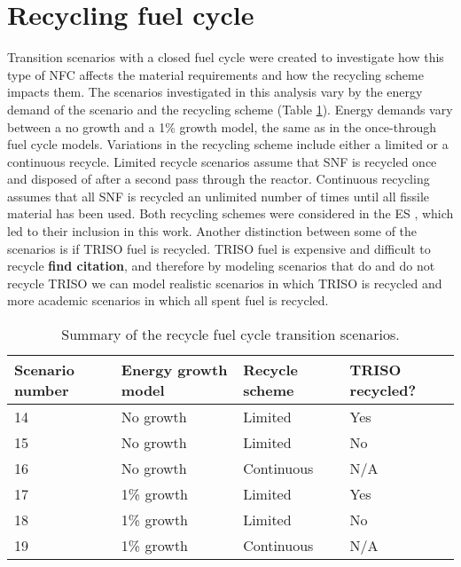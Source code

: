 \section{Recycling fuel cycle}\label{sec:recycle-methods}
Transition scenarios with a closed fuel cycle were created
to investigate how this type of \gls{NFC} affects the material requirements 
and how the recycling scheme impacts them. The scenarios investigated in 
this analysis vary by the energy demand of the scenario and the recycling 
scheme (Table \ref{tab:scenarios_recycle}). Energy demands vary 
between a no growth and a 1\% growth model, the same as in the once-through 
fuel cycle models. Variations in the recycling 
scheme include either a limited or a continuous recycle. Limited recycle 
scenarios assume that \gls{SNF} is recycled once and disposed of after a 
second pass through the reactor. Continuous recycling assumes that all 
\gls{SNF} is recycled an unlimited number of times until all fissile 
material has been used. Both recycling schemes were considered in the 
\acrfull{ES} \cite{wigeland_nuclear_2014}, which led to their inclusion 
in this work. Another distinction between some of the 
scenarios is if \gls{TRISO} fuel is recycled. \gls{TRISO} fuel is 
expensive and difficult to recycle \textbf{find citation}, and 
therefore by modeling scenarios that do and do not recycle 
\gls{TRISO} we can model realistic scenarios in which \gls{TRISO} 
is recycled and more academic scenarios in which all spent fuel is 
recycled. 

\begin{table}[ht]
    \centering
    \caption{Summary of the recycle fuel cycle transition scenarios.}
    \label{tab:scenarios_recycle}
    \begin{tabular}{l l l l}
            \hline
            Scenario number & Energy growth model & Recycle scheme & TRISO recycled?\\
            \hline
            14 & No growth & Limited & Yes\\
            15 & No growth & Limited & No\\
            16 & No growth & Continuous & N/A \\
            17 & 1\% growth & Limited & Yes\\
            18 & 1\% growth & Limited & No\\
            19 & 1\% growth & Continuous & N/A \\
            \hline
    \end{tabular}
\end{table}

